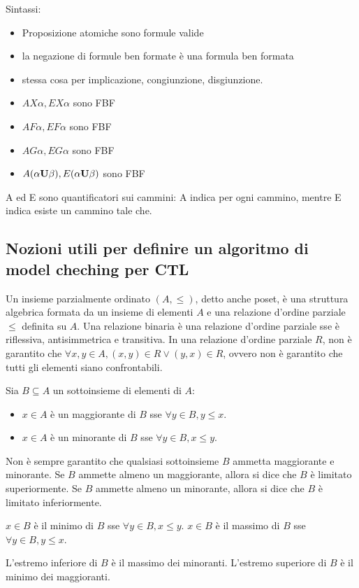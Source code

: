 Sintassi:
\begin{itemize}
    \item Proposizione atomiche sono formule valide
    \item la negazione di formule ben formate è una formula ben formata
    \item stessa cosa per implicazione, congiunzione, disgiunzione.
    \item $AX \alpha, EX \alpha$ sono FBF
    \item $AF \alpha, EF \alpha$ sono FBF
    \item $AG \alpha, EG \alpha$ sono FBF
    \item $A(\alpha \textnormal{\textbf{U}} \beta), E(\alpha \textnormal{\textbf{U}} \beta)$ sono FBF
\end{itemize}

A ed E sono quantificatori sui cammini: A indica per ogni cammino, mentre
E indica esiste un cammino tale che.

\subsection*{Nozioni utili per definire un algoritmo di model cheching per CTL}
Un insieme parzialmente ordinato $(A, \le)$, detto anche poset, è una struttura
algebrica formata da un insieme di elementi $A$ e una relazione d'ordine parziale
$\le$ definita su $A$.
Una relazione binaria è una relazione d'ordine parziale sse è riflessiva,
antisimmetrica e transitiva.
In una relazione d'ordine parziale $R$, non è garantito che
$\forall x, y \in A, (x,y) \in R \lor (y,x) \in R$, ovvero non è garantito
che tutti gli elementi siano confrontabili.

Sia $B \subseteq A$ un sottoinsieme di elementi di $A$:
\begin{itemize}
    \item $x \in A$ è un maggiorante di $B$ sse $\forall y \in B, y \le x$.
    \item $x \in A$ è un minorante di $B$ sse $\forall y \in B, x \le y$.
\end{itemize}
Non è sempre garantito che qualsiasi sottoinsieme $B$ ammetta maggiorante
e minorante.
Se $B$ ammette almeno un maggiorante, allora si dice che $B$ è limitato
superiormente.
Se $B$ ammette almeno un minorante, allora si dice che $B$ è limitato
inferiormente.

$x \in B$ è il minimo di $B$ sse $\forall y \in B, x \le y$.
$x \in B$ è il massimo di $B$ sse $\forall y \in B, y \le x$.

L'estremo inferiore di $B$ è il massimo dei minoranti.
L'estremo superiore di $B$ è il minimo dei maggioranti.

